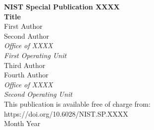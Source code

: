 \documentclass[12pt]{article}
\newcommand{\pubnumber}{XXXX}
\newcommand{\DOI}{https://doi.org/10.6028/NIST.SP.XXXX}
\newcommand{\monthyear}{Month Year}
\begin{document}
\begin{titlepage}
\begin{flushright}
\LARGE{\textbf{NIST Special Publication \pubnumber}}\\
\vfill 
\Huge{\textbf{Title}}\\
\vfill
\normalsize First Author\\
Second Author\\
\textit{Office of XXXX}\\
\textit{First Operating Unit}\\
\vspace{12pt}
Third Author\\
Fourth Author\\
\textit{Office of XXXX}\\
\textit{Second Operating Unit}\\
\vfill
\normalsize This publication is available free of charge from:\\
\DOI\\
\vfill
\normalsize \monthyear
\vfill


\end{flushright}
\end{titlepage}
\end{document}
